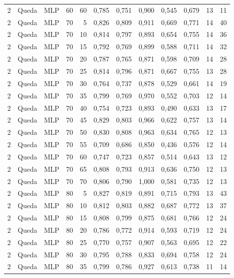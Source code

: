 \begin{longtable}{ccclrrrrrrrr}
2 & Queda & MLP & 60 & 60 & 0,785 & 0,751 & 0,900 & 0,545 & 0,679 & 13 & 11 \\
2 & Queda & MLP & 70 & 5 & 0,826 & 0,809 & 0,911 & 0,669 & 0,771 & 14 & 40 \\
2 & Queda & MLP & 70 & 10 & 0,814 & 0,797 & 0,893 & 0,654 & 0,755 & 14 & 36 \\
2 & Queda & MLP & 70 & 15 & 0,792 & 0,769 & 0,899 & 0,588 & 0,711 & 14 & 32 \\
2 & Queda & MLP & 70 & 20 & 0,787 & 0,765 & 0,871 & 0,598 & 0,709 & 14 & 28 \\
2 & Queda & MLP & 70 & 25 & 0,814 & 0,796 & 0,871 & 0,667 & 0,755 & 13 & 28 \\
2 & Queda & MLP & 70 & 30 & 0,764 & 0,737 & 0,878 & 0,529 & 0,661 & 14 & 19 \\
2 & Queda & MLP & 70 & 35 & 0,799 & 0,769 & 0,970 & 0,552 & 0,703 & 12 & 14 \\
2 & Queda & MLP & 70 & 40 & 0,754 & 0,723 & 0,893 & 0,490 & 0,633 & 13 & 17 \\
2 & Queda & MLP & 70 & 45 & 0,829 & 0,803 & 0,966 & 0,622 & 0,757 & 13 & 14 \\
2 & Queda & MLP & 70 & 50 & 0,830 & 0,808 & 0,963 & 0,634 & 0,765 & 12 & 13 \\
2 & Queda & MLP & 70 & 55 & 0,709 & 0,686 & 0,850 & 0,436 & 0,576 & 12 & 14 \\
2 & Queda & MLP & 70 & 60 & 0,747 & 0,723 & 0,857 & 0,514 & 0,643 & 13 & 12 \\
2 & Queda & MLP & 70 & 65 & 0,808 & 0,793 & 0,913 & 0,636 & 0,750 & 12 & 13 \\
2 & Queda & MLP & 70 & 70 & 0,806 & 0,790 & 1,000 & 0,581 & 0,735 & 12 & 13 \\
2 & Queda & MLP & 80 & 5 & 0,827 & 0,819 & 0,891 & 0,715 & 0,793 & 13 & 43 \\
2 & Queda & MLP & 80 & 10 & 0,812 & 0,803 & 0,882 & 0,687 & 0,772 & 13 & 37 \\
2 & Queda & MLP & 80 & 15 & 0,808 & 0,799 & 0,875 & 0,681 & 0,766 & 12 & 24 \\
2 & Queda & MLP & 80 & 20 & 0,786 & 0,772 & 0,914 & 0,593 & 0,719 & 12 & 24 \\
2 & Queda & MLP & 80 & 25 & 0,770 & 0,757 & 0,907 & 0,563 & 0,695 & 12 & 22 \\
2 & Queda & MLP & 80 & 30 & 0,795 & 0,788 & 0,833 & 0,694 & 0,758 & 12 & 24 \\
2 & Queda & MLP & 80 & 35 & 0,799 & 0,786 & 0,927 & 0,613 & 0,738 & 11 & 14 \\

\end{longtable}
